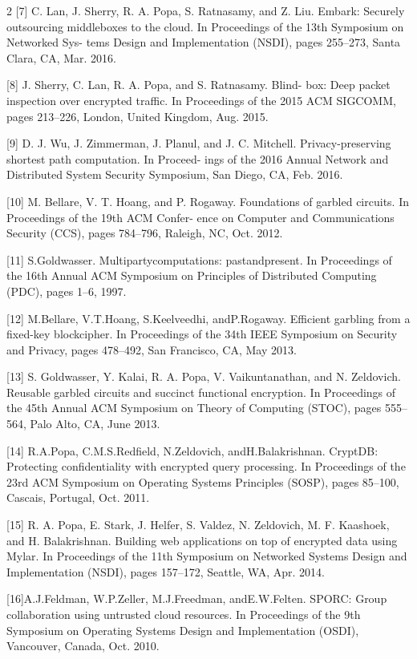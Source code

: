 \documentclass[12pt,a4paper]{article}
\begin{document}
\begin{multicols}{2}
[7] C. Lan, J. Sherry, R. A. Popa, S. Ratnasamy, and Z. Liu. Embark: Securely outsourcing middleboxes to the cloud. In Proceedings of the 13th Symposium on Networked Sys- tems Design and Implementation (NSDI), pages 255–273, Santa Clara, CA, Mar. 2016.

[8] J. Sherry, C. Lan, R. A. Popa, and S. Ratnasamy. Blind- box: Deep packet inspection over encrypted traffic. In Proceedings of the 2015 ACM SIGCOMM, pages 213–226, London, United Kingdom, Aug. 2015.

[9] D. J. Wu, J. Zimmerman, J. Planul, and J. C. Mitchell. Privacy-preserving shortest path computation. In Proceed- ings of the 2016 Annual Network and Distributed System Security Symposium, San Diego, CA, Feb. 2016.

[10] M. Bellare, V. T. Hoang, and P. Rogaway. Foundations of garbled circuits. In Proceedings of the 19th ACM Confer- ence on Computer and Communications Security (CCS), pages 784–796, Raleigh, NC, Oct. 2012.

[11] S.Goldwasser. Multipartycomputations: pastandpresent. In Proceedings of the 16th Annual ACM Symposium on Principles of Distributed Computing (PDC), pages 1–6, 1997.

[12] M.Bellare, V.T.Hoang, S.Keelveedhi, andP.Rogaway. Efficient garbling from a fixed-key blockcipher. In Proceedings of the 34th IEEE Symposium on Security and Privacy, pages 478–492, San Francisco, CA, May 2013.

[13] S. Goldwasser, Y. Kalai, R. A. Popa, V. Vaikuntanathan, and N. Zeldovich. Reusable garbled circuits and succinct functional encryption. In Proceedings of the 45th Annual ACM Symposium on Theory of Computing (STOC), pages 555–564, Palo Alto, CA, June 2013.

[14] R.A.Popa, C.M.S.Redfield, N.Zeldovich, andH.Balakrishnan. CryptDB: Protecting confidentiality with encrypted query processing. In Proceedings of the 23rd ACM Symposium on Operating Systems Principles (SOSP), pages 85–100, Cascais, Portugal, Oct. 2011.

[15] R. A. Popa, E. Stark, J. Helfer, S. Valdez, N. Zeldovich, M. F. Kaashoek, and H. Balakrishnan. Building web applications on top of encrypted data using Mylar. In Proceedings of the 11th Symposium on Networked Systems Design and Implementation (NSDI), pages 157–172, Seattle, WA, Apr. 2014.

[16]A.J.Feldman, W.P.Zeller, M.J.Freedman, andE.W.Felten. SPORC: Group collaboration using untrusted cloud resources. In Proceedings of the 9th Symposium on Operating Systems Design and Implementation (OSDI), Vancouver, Canada, Oct. 2010.


\end{multicols}
\end{document}
